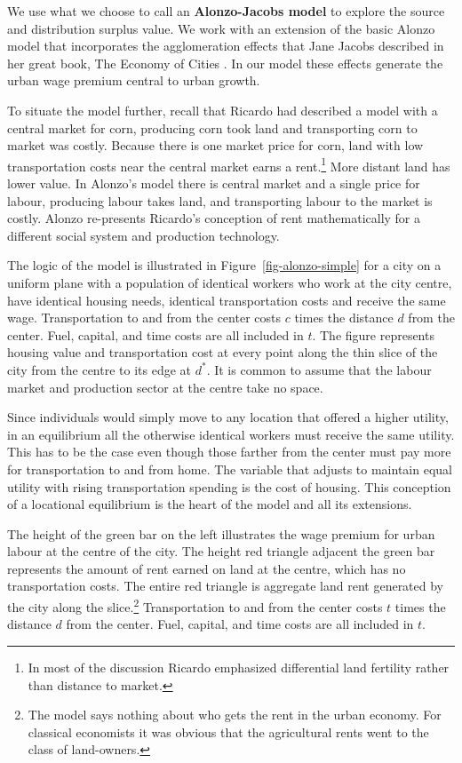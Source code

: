 We use what we choose to call an \textbf{\gls{Alonzo-Jacobs model}}  to explore the source and distribution surplus value. We  work with an extension of the basic Alonzo model that incorporates the \gls{agglomeration effects} that Jane Jacobs  described in her great book, The Economy of Cities \cite{jacobsEconomyCities1969}. In our model these effects generate the  \gls{urban wage premium} central to urban growth. %

To situate the model further, recall that Ricardo had described a model with a central market for corn, producing corn took land and transporting corn to market was costly. Because there is one market price for corn, land with low transportation costs near the central market earns a rent.\footnote{In most of the discussion Ricardo emphasized  differential land fertility rather than distance to market.} More distant land has lower value. In Alonzo's model there is central market and a single price for labour, producing labour takes land, and transporting labour to the market is costly. Alonzo re-presents Ricardo's conception of rent  mathematically for a different social system and production technology.  

The logic of the model is illustrated in Figure~\ref{fig-alonzo-simple} for a city on a uniform plane with a population of identical workers who work at the city centre, have identical housing needs,  identical transportation costs and receive the same wage. Transportation to and from the center costs ${c}$ times the distance $d$ from the center. Fuel, capital, and time costs are  all included in $t$. The figure represents housing value and transportation cost at every point along the thin slice of the city from the centre to its edge at $d^*$.  It is common to assume that the labour market and production sector at the centre take no space. 

 Since individuals would simply move to any location that offered a higher utility, in an equilibrium all the otherwise identical workers must receive the same utility. This has to be the case even though those farther from the center must pay more for transportation to and from home. The variable that  adjusts to maintain equal utility with rising transportation spending is the cost of housing. This conception of a \gls{locational equilibrium} is the heart of the model and all its extensions.

The height of the green bar on the left illustrates the wage premium for urban labour at the centre of the  city. 
The height red triangle adjacent the green bar represents the amount of rent earned on land at the centre, which has no transportation costs. The entire red triangle is aggregate land rent generated by the city along the slice.\footnote{The model says nothing about who gets the rent in the urban economy. For classical economists it was obvious that the agricultural rents went to the class of land-owners.} Transportation to and from the center costs $t$ times the distance $d$ from the center. Fuel, capital, and time costs are  all included in $t$. 

